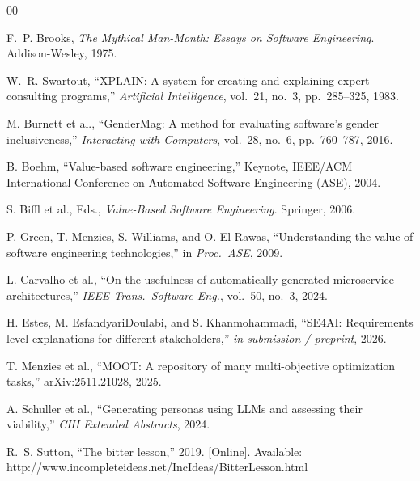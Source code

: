 \documentclass[10pt,conference]{IEEEtran}
\begin{document}
\begin{thebibliography}{00}

F.~P. Brooks, \emph{The Mythical Man-Month: Essays on Software Engineering}.
Addison-Wesley, 1975.

W.~R. Swartout, ``XPLAIN: A system for creating and explaining expert consulting programs,''
\emph{Artificial Intelligence}, vol.~21, no.~3, pp.~285--325, 1983.

M. Burnett et al., ``GenderMag: A method for evaluating software's gender inclusiveness,''
\emph{Interacting with Computers}, vol.~28, no.~6, pp.~760--787, 2016.

B. Boehm, ``Value-based software engineering,'' Keynote, IEEE/ACM International Conference on Automated Software Engineering (ASE), 2004.

S. Biffl et al., Eds., \emph{Value-Based Software Engineering}. Springer, 2006.

P. Green, T. Menzies, S. Williams, and O. El-Rawas, ``Understanding the value of software engineering technologies,''
in \emph{Proc.\ ASE}, 2009.

L. Carvalho et al., ``On the usefulness of automatically generated microservice architectures,''
\emph{IEEE Trans.\ Software Eng.}, vol.~50, no.~3, 2024.

H. Estes, M. EsfandyariDoulabi, and S. Khanmohammadi, ``SE4AI: Requirements level explanations for different stakeholders,''
\emph{in submission / preprint}, 2026.

T. Menzies et al., ``MOOT: A repository of many multi-objective optimization tasks,''
arXiv:2511.21028, 2025.

A. Schuller et al., ``Generating personas using LLMs and assessing their viability,''
\emph{CHI Extended Abstracts}, 2024.

R.~S. Sutton, ``The bitter lesson,'' 2019. [Online]. Available: http://www.incompleteideas.net/IncIdeas/BitterLesson.html

\end{thebibliography}
\end{document}
